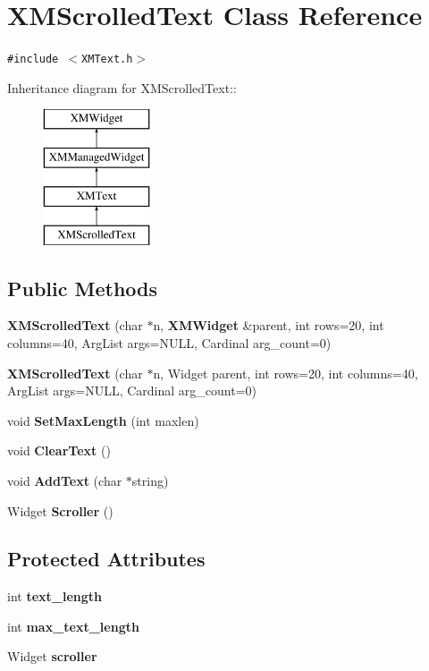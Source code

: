 \section{XMScrolled\-Text  Class Reference}
\label{classXMScrolledText}
{\tt \#include $<$XMText.h$>$}

Inheritance diagram for XMScrolled\-Text::\begin{figure}[H]
\begin{center}
\leavevmode
\includegraphics[height=4cm]{classXMScrolledText}
\end{center}
\end{figure}
\subsection*{Public Methods}
\begin{CompactItemize}
\item 
{\bf XMScrolled\-Text} (char $\ast$n, {\bf XMWidget} \&parent, int rows=20, int columns=40, Arg\-List args=NULL, Cardinal arg\_\-count=0)
\item 
{\bf XMScrolled\-Text} (char $\ast$n, Widget parent, int rows=20, int columns=40, Arg\-List args=NULL, Cardinal arg\_\-count=0)
\item 
void {\bf Set\-Max\-Length} (int maxlen)
\item 
void {\bf Clear\-Text} ()
\item 
void {\bf Add\-Text} (char $\ast$string)
\item 
Widget {\bf Scroller} ()
\end{CompactItemize}
\subsection*{Protected Attributes}
\begin{CompactItemize}
\item 
int {\bf text\_\-length}
\item 
int {\bf max\_\-text\_\-length}
\item 
Widget {\bf scroller}
\end{CompactItemize}


